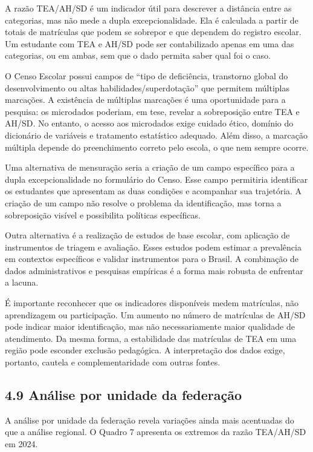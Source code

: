 A razão TEA/AH/SD é um indicador útil para descrever a distância entre
as categorias, mas não mede a dupla excepcionalidade. Ela é calculada a
partir de totais de matrículas que podem se sobrepor e que dependem do
registro escolar. Um estudante com TEA e AH/SD pode ser contabilizado
apenas em uma das categorias, ou em ambas, sem que o dado permita saber
qual foi o caso.

O Censo Escolar possui campos de ``tipo de deficiência, transtorno
global do desenvolvimento ou altas habilidades/superdotação'' que
permitem múltiplas marcações. A existência de múltiplas marcações é uma
oportunidade para a pesquisa: os microdados poderiam, em tese, revelar a
sobreposição entre TEA e AH/SD. No entanto, o acesso aos microdados
exige cuidado ético, domínio do dicionário de variáveis e tratamento
estatístico adequado. Além disso, a marcação múltipla depende do
preenchimento correto pelo escola, o que nem sempre ocorre.

Uma alternativa de mensuração seria a criação de um campo específico
para a dupla excepcionalidade no formulário do Censo. Esse campo
permitiria identificar os estudantes que apresentam as duas condições e
acompanhar sua trajetória. A criação de um campo não resolve o problema
da identificação, mas torna a sobreposição visível e possibilita
políticas específicas.

Outra alternativa é a realização de estudos de base escolar, com
aplicação de instrumentos de triagem e avaliação. Esses estudos podem
estimar a prevalência em contextos específicos e validar instrumentos
para o Brasil. A combinação de dados administrativos e pesquisas
empíricas é a forma mais robusta de enfrentar a lacuna.

É importante reconhecer que os indicadores disponíveis medem matrículas,
não aprendizagem ou participação. Um aumento no número de matrículas de
AH/SD pode indicar maior identificação, mas não necessariamente maior
qualidade de atendimento. Da mesma forma, a estabilidade das matrículas
de TEA em uma região pode esconder exclusão pedagógica. A interpretação
dos dados exige, portanto, cautela e complementaridade com outras
fontes.

\subsection{4.9 Análise por unidade da
federação}\label{anuxe1lise-por-unidade-da-federauxe7uxe3o}

A análise por unidade da federação revela variações ainda mais
acentuadas do que a análise regional. O Quadro 7 apresenta os extremos
da razão TEA/AH/SD em 2024.

